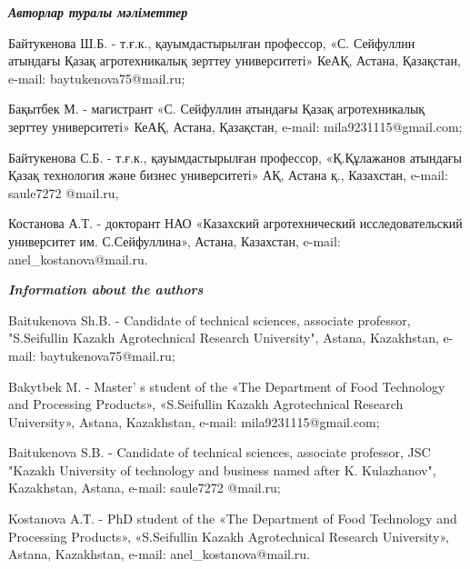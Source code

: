 \begin{info}
\hspace{1em}\emph{{\bfseries Авторлар туралы мәліметтер}}

Байтукенова Ш.Б. - т.ғ.к., қауымдастырылған профессор, «С. Сейфуллин
атындағы Қазақ агротехникалық зерттеу университеті» КеАҚ, Астана,
Қазақстан, e-mail:
baytukenova75@mail.ru;

Бақытбек М. - магистрант «С. Сейфуллин атындағы Қазақ агротехникалық
зерттеу университеті» КеАҚ, Астана, Қазақстан, e-mail:
mila9231115@gmail.com;

Байтукенова С.Б. - т.ғ.к., қауымдастырылған профессор, «Қ.Құлажанов
атындағы Қазақ технология және бизнес университеті» АҚ, Астана қ.,
Казахстан, e-mail: saule7272 @mail.ru,

Костанова А.Т. - докторант НАО «Казахский агротехнический
исследовательский университет им. С.Сейфуллина», Астана, Казахстан,
e-mail: anel\_kostanova@mail.ru.

\hspace{1em}\emph{{\bfseries Information about the authors}}

Baitukenova Sh.B. - Candidate of technical sciences, associate
professor, "S.Seifullin Kazakh Agrotechnical Research University",
Astana, Kazakhstan, e-mail: baytukenova75@mail.ru;

Bakytbek M. - Master' s student of the «The Department of
Food Technology and Processing Products», «S.Seifullin Kazakh
Agrotechnical Research University», Astana, Kazakhstan, e-mail:
mila9231115@gmail.com;

Baitukenova S.B. - Candidate of technical sciences, associate professor,
JSC "Kazakh University of technology and business named after K.
Kulazhanov", Kazakhstan, Astana, e-mail: saule7272 @mail.ru;

Kostanova A.Т. - PhD student of the «The Department of Food Technology
and Processing Products», «S.Seifullin Kazakh Agrotechnical Research
University», Astana, Kazakhstan, e-mail: anel\_kostanova@mail.ru.
\end{info}
